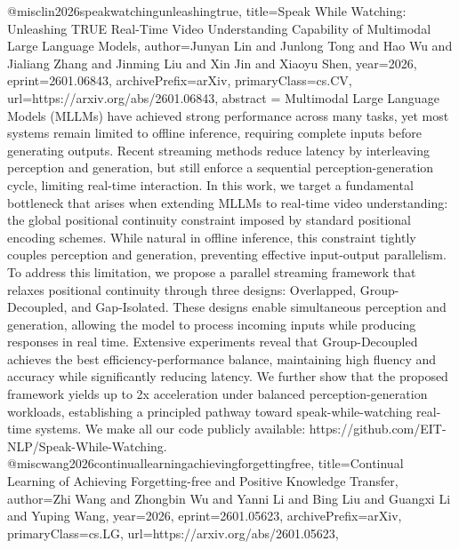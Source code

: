 {}@misc{lin2026speakwatchingunleashingtrue,
      title={Speak While Watching: Unleashing TRUE Real-Time Video Understanding Capability of Multimodal Large Language Models}, 
      author={Junyan Lin and Junlong Tong and Hao Wu and Jialiang Zhang and Jinming Liu and Xin Jin and Xiaoyu Shen},
      year={2026},
      eprint={2601.06843},
      archivePrefix={arXiv},
      primaryClass={cs.CV},
      url={https://arxiv.org/abs/2601.06843},
      abstract = {Multimodal Large Language Models (MLLMs) have achieved strong performance across many tasks, yet most systems remain limited to offline inference, requiring complete inputs before generating outputs. Recent streaming methods reduce latency by interleaving perception and generation, but still enforce a sequential perception-generation cycle, limiting real-time interaction. In this work, we target a fundamental bottleneck that arises when extending MLLMs to real-time video understanding: the global positional continuity constraint imposed by standard positional encoding schemes. While natural in offline inference, this constraint tightly couples perception and generation, preventing effective input-output parallelism. To address this limitation, we propose a parallel streaming framework that relaxes positional continuity through three designs: Overlapped, Group-Decoupled, and Gap-Isolated. These designs enable simultaneous perception and generation, allowing the model to process incoming inputs while producing responses in real time. Extensive experiments reveal that Group-Decoupled achieves the best efficiency-performance balance, maintaining high fluency and accuracy while significantly reducing latency. We further show that the proposed framework yields up to 2x acceleration under balanced perception-generation workloads, establishing a principled pathway toward speak-while-watching real-time systems. We make all our code publicly available: https://github.com/EIT-NLP/Speak-While-Watching.}
}@misc{wang2026continuallearningachievingforgettingfree,
      title={Continual Learning of Achieving Forgetting-free and Positive Knowledge Transfer}, 
      author={Zhi Wang and Zhongbin Wu and Yanni Li and Bing Liu and Guangxi Li and Yuping Wang},
      year={2026},
      eprint={2601.05623},
      archivePrefix={arXiv},
      primaryClass={cs.LG},
      url={https://arxiv.org/abs/2601.05623},
}
